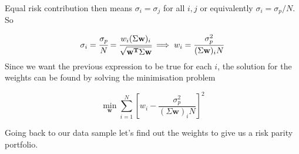 Equal risk contribution then means \(\sigma _{i} =\sigma _{j}\) for all
\(i,j\) or equivalently \(\sigma _{i}=\sigma_p/N\). So

\begin{equation}\sigma _{i} = \cfrac{\sigma_p}{N}={\cfrac {w_{i}(\Sigma \mathbf{w})_{i}}{\sqrt {\mathbf{w^T}\Sigma \mathbf{w}}}}\implies w_{i} = \frac {\sigma_p^{2}}{(\Sigma \mathbf{w})_{i}N}\end{equation}
Since we want the previous expression to be true for each $i$, the solution for the weights can be found by solving the minimisation problem

\begin{equation} \underset{\mathbf{w}}{\min } \sum _{i=1}^{N}\left[w_{i}-{\frac {\sigma_p^{2}}{(\Sigma \mathbf{w})_{i}N}}\right]^{2} \end{equation}

Going back to our data sample let's find out the weights to give us a
risk parity portfolio.

